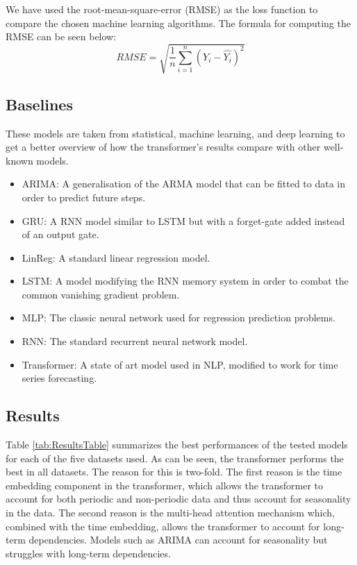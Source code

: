 We have used the root-mean-square-error (RMSE) as the loss function to compare the chosen machine learning algorithms. The formula for computing the RMSE can be seen below: 
$$RMSE = \sqrt{\frac 1 n \displaystyle\sum_{i=1}^n(Y_i - \hat{Y_i})^2}$$

\subsection{Baselines}

These models are taken from statistical, machine learning, and deep learning to get a better overview of how the transformer's results compare with other well-known models.
\begin{itemize}
    \item ARIMA\cite{ARIMA-book}: A generalisation of the ARMA model that can be fitted to data in order to predict future steps.
    \item GRU\cite{GRU-paper}: A RNN model similar to LSTM but with a forget-gate added instead of an output gate.
    \item LinReg: A standard linear regression model.
    \item LSTM\cite{LSTM-paper}: A model modifying the RNN memory system in order to combat the common vanishing gradient problem.
    \item MLP\cite{MLP-paper}: The classic neural network used for regression prediction problems.
    \item RNN\cite{RNN-paper}: The standard recurrent neural network model.
    \item Transformer\cite{AttentionIsAllYouNeed}: A state of art model used in NLP, modified to work for time series forecasting.
\end{itemize}

\subsection{Results}
Table \ref{tab:ResultsTable} summarizes the best performances of the tested models for each of the five datasets used. 
As can be seen, the transformer performs the best in all datasets. The reason for this is two-fold. 
The first reason is the time embedding component in the transformer, which allows the transformer to account for both periodic and non-periodic data and thus account for seasonality in the data. 
The second reason is the multi-head attention mechanism which, combined with the time embedding, allows the transformer to account for long-term dependencies. Models such as ARIMA can account for seasonality but struggles with long-term dependencies. 

